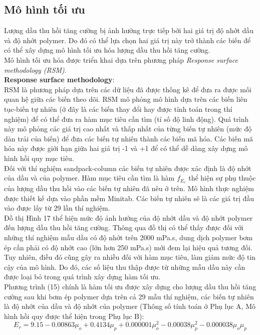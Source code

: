 \documentclass[12pt,a4paper]{article}
\begin{document}
	\subsection{Mô hình tối ưu}
	Lượng dầu thu hồi tăng cường bị ảnh hưởng trực tiếp bởi hai giá trị độ nhớt dầu và độ nhớt polymer. Do đó có thể lựa chọn hai giá trị này trở thành các biến để có thể xây dựng mô hình tối ưu hóa lượng dầu thu hồi tăng cường.\\
	Mô hình tối ưu hóa được triển khai dựa trên phương pháp \textit{Response surface methodology (RSM)}.\\
	\textbf{Response surface methodology}:\\
	RSM là phương pháp dựa trên các dữ liệu đã được thống kê để đưa ra được mối quan hệ giữa các biến theo dõi. RSM mô phỏng mô hình dựa trên các biến liên tục-biến tự nhiên (ở đây là các biến thay đổi hay được tính toán trong thí nghiệm) để có thể đưa ra hàm mục tiêu cần tìm \cite{leijen2011response} (tỉ số độ linh động). Quá trình này mô phỏng các giá trị cao nhất và thấp nhất của từng biến tự nhiên (mức độ dàn trải của biến) để đưa các biến tự nhiên thành các biến mã hóa. Các biến mã hóa này được giới hạn giữa hai giá trị -1 và +1 để có thể dễ dàng xây dựng mô hình hồi quy mục tiêu.\\
	Đối với thí nghiệm sandpack-column các biến tự nhiên được xác định là độ nhớt của dầu và của polymer. Hàm mục tiêu cần tìm là hàm $f_{E_r}$ thể hiện sự phụ thuộc của lượng dầu thu hồi vào các biến tự nhiên đã nêu ở trên. Mô hình thực nghiệm được thiết kế dựa vào phần mềm Minitab. Các biến tự nhiên sẽ là các giá trị đầu vào được lấy từ 29 lần thí nghiệm.\\
	Đồ thị Hình 17 thể hiện mức độ ảnh hưởng của độ nhớt dầu và độ nhớt polymer đến lượng dầu thu hồi tăng cường. Thông qua đồ thị có thể thấy được đối với những thí nghiệm mẫu dầu có độ nhớt trên 2000 mPa.s, dung dịch polymer bơm ép cần phải có độ nhớt cao (lớn hơn 250 mPa.s) mới đem lại hiệu quả tương đối. Tuy nhiên, điều đó cũng gây ra nhiễu đối với hàm mục tiêu, làm giảm mức độ tin cậy của mô hình. Do đó, các số liệu thu thập được từ những mẫu dầu này cần được loại bỏ trong quá trình xây dựng hàm tối ưu.\\
	Phương trình (15) chính là hàm tối ưu được xây dựng cho lượng dầu thu hồi tăng cường sau khi bơm ép polymer dựa trên cả 29 mẫu thí nghiệm, các biến tự nhiên là độ nhớt của dầu và độ nhớt của polymer (Thông số tính toán ở Phụ lục A, Mô hình hồi quy được thể hiện trong Phụ lục B):
	\newpage
	\begin{equation}
	E_r = 9.15-0.00863\mu_o+0.4134\mu_p+0.000001\mu_o^2-0.00038\mu_p^2-0.000038\mu_o\mu_p
	\end{equation}
\end{document}
